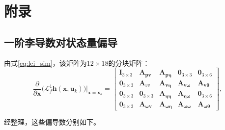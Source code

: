 \setcounter{chapter}{1} %
\setcounter{section}{0}
\setcounter{equation}{0}
\setcounter{table}{0}   
\setcounter{figure}{0}
\chapter{附\texorpdfstring{\quad}{}录} %

\section{一阶李导数对状态量偏导}
\label{appendix:lei}
由式\ref{eq:lei_sim}，该矩阵为$12 \times 18$的分块矩阵：
\begin{equation}
    \frac{\partial}{\partial \boldsymbol{x}}\big( \mathcal{L}_f^1 \boldsymbol{h}(\boldsymbol{x}, \boldsymbol{u}_k) \big)\Big|_{\boldsymbol{x}=\boldsymbol{x}_k} = 
    \begin{bmatrix}
        \boldsymbol{I}_{3 \times 3} & \boldsymbol{A}_{\boldsymbol{p} \boldsymbol{v}} & \boldsymbol{A}_{\boldsymbol{p} \boldsymbol{\eta}} & \boldsymbol{0}_{3 \times 3} & \boldsymbol{0}_{3 \times 6} \\
        \boldsymbol{0}_{3 \times 3} & \boldsymbol{A}_{v v} & \boldsymbol{A}_{\boldsymbol{v \eta}} & \boldsymbol{A}_{\boldsymbol{v \omega}} & \boldsymbol{A}_{\boldsymbol{v \theta}} \\
        \boldsymbol{0}_{3 \times 3} & \boldsymbol{0}_{3 \times 3} & \boldsymbol{A}_{\boldsymbol{\eta \eta}} & \boldsymbol{A}_{\boldsymbol{\eta \omega}} & \boldsymbol{0}_{3 \times 6} \\
        \boldsymbol{0}_{3 \times 3} & \boldsymbol{A}_{\boldsymbol{\omega v}} & \boldsymbol{A}_{\boldsymbol{\omega \eta}} & \boldsymbol{A}_{\boldsymbol{\omega \omega}} & \boldsymbol{A}_{\boldsymbol{\omega \theta}}
    \end{bmatrix},
\end{equation}

经整理，这些偏导数分别如下。

